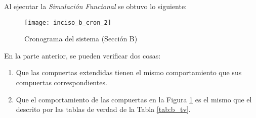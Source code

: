 \documentclass[../procedimientos.tex]{subfiles}
\begin{document}
Al ejecutar la \textit{Simulación Funcional} se obtuvo lo siguiente:
\begin{figure}[H]
  \centering
  \texttt{[image: inciso\_b\_cron\_2]}
  \caption{Cronograma del sistema (Sección B)}
  \label{fig:cron_b}
\end{figure}

En la parte anterior, se pueden verificar dos cosas:
\begin{enumerate}
  \item Que las compuertas extendidas tienen el mismo comportamiento que sus 
    compuertas correspondientes.
  \item Que el comportamiento de las compuertas en la Figura \ref{fig:cron_b} 
    es el mismo que el descrito por las tablas de verdad de la Tabla 
    \ref{tab:b_tv}.
\end{enumerate}
\end{document}
